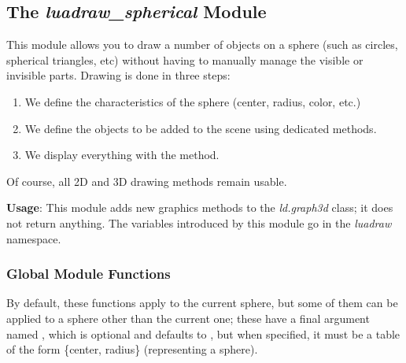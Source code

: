 \subsection{The \emph{luadraw\_spherical} Module} 

This module allows you to draw a number of objects on a sphere (such as circles, spherical triangles, etc) without having to manually manage the visible or invisible parts. Drawing is done in three steps:
\begin{enumerate}
    \item We define the characteristics of the sphere (center, radius, color, etc.)
    \item We define the objects to be added to the scene using dedicated methods.
    \item We display everything with the  method.
\end{enumerate}
Of course, all 2D and 3D drawing methods remain usable.

\textbf{Usage}: This module adds new graphics methods to the \emph{ld.graph3d} class; it does not return anything. The variables introduced by this module go in the \emph{luadraw} namespace.

\subsubsection{Global Module Functions}

By default, these functions apply to the current sphere, but some of them can be applied to a sphere other than the current one; these have a final argument named , which is optional and defaults to \nil, but when specified, it must be a table of the form \{center, radius\} (representing a sphere).

